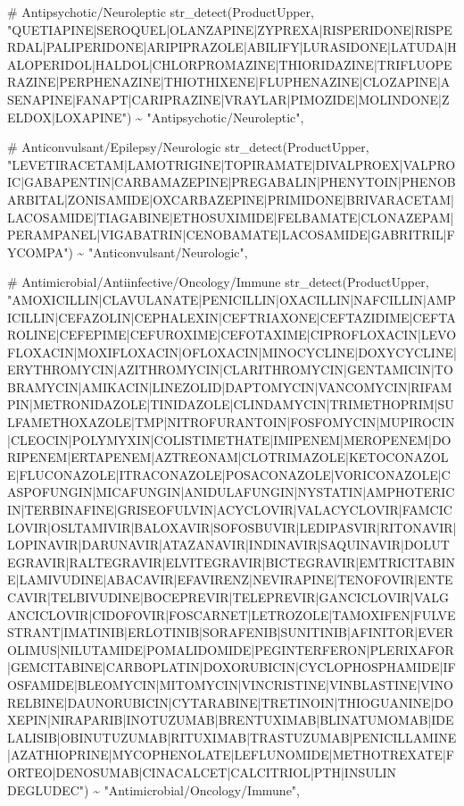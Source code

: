 \documentclass[
  letterpaper,
  DIV=11,
  numbers=noendperiod]{scrartcl}
\newenvironment{Shaded}{\begin{snugshade}}{\end{snugshade}}
\newcommand{\CommentTok}[1]{\textcolor[rgb]{0.37,0.37,0.37}{#1}}
\newcommand{\FunctionTok}[1]{\textcolor[rgb]{0.28,0.35,0.67}{#1}}
\newcommand{\NormalTok}[1]{\textcolor[rgb]{0.00,0.23,0.31}{#1}}
\newcommand{\SpecialCharTok}[1]{\textcolor[rgb]{0.37,0.37,0.37}{#1}}
\newcommand{\StringTok}[1]{\textcolor[rgb]{0.13,0.47,0.30}{#1}}
\begin{document}
\begin{Shaded}
\begin{Highlighting}[]
        \CommentTok{\# Antipsychotic/Neuroleptic}
        \FunctionTok{str\_detect}\NormalTok{(ProductUpper, }\StringTok{"QUETIAPINE|SEROQUEL|OLANZAPINE|ZYPREXA|RISPERIDONE|RISPERDAL|PALIPERIDONE|ARIPIPRAZOLE|ABILIFY|LURASIDONE|LATUDA|HALOPERIDOL|HALDOL|CHLORPROMAZINE|THIORIDAZINE|TRIFLUOPERAZINE|PERPHENAZINE|THIOTHIXENE|FLUPHENAZINE|CLOZAPINE|ASENAPINE|FANAPT|CARIPRAZINE|VRAYLAR|PIMOZIDE|MOLINDONE|ZELDOX|LOXAPINE"}\NormalTok{) }\SpecialCharTok{\textasciitilde{}} \StringTok{"Antipsychotic/Neuroleptic"}\NormalTok{,}
  
        \CommentTok{\# Anticonvulsant/Epilepsy/Neurologic}
        \FunctionTok{str\_detect}\NormalTok{(ProductUpper, }\StringTok{"LEVETIRACETAM|LAMOTRIGINE|TOPIRAMATE|DIVALPROEX|VALPROIC|GABAPENTIN|CARBAMAZEPINE|PREGABALIN|PHENYTOIN|PHENOBARBITAL|ZONISAMIDE|OXCARBAZEPINE|PRIMIDONE|BRIVARACETAM|LACOSAMIDE|TIAGABINE|ETHOSUXIMIDE|FELBAMATE|CLONAZEPAM|PERAMPANEL|VIGABATRIN|CENOBAMATE|LACOSAMIDE|GABRITRIL|FYCOMPA"}\NormalTok{) }\SpecialCharTok{\textasciitilde{}} \StringTok{"Anticonvulsant/Neurologic"}\NormalTok{,}
  
        \CommentTok{\# Antimicrobial/Antiinfective/Oncology/Immune}
        \FunctionTok{str\_detect}\NormalTok{(ProductUpper, }\StringTok{"AMOXICILLIN|CLAVULANATE|PENICILLIN|OXACILLIN|NAFCILLIN|AMPICILLIN|CEFAZOLIN|CEPHALEXIN|CEFTRIAXONE|CEFTAZIDIME|CEFTAROLINE|CEFEPIME|CEFUROXIME|CEFOTAXIME|CIPROFLOXACIN|LEVOFLOXACIN|MOXIFLOXACIN|OFLOXACIN|MINOCYCLINE|DOXYCYCLINE|ERYTHROMYCIN|AZITHROMYCIN|CLARITHROMYCIN|GENTAMICIN|TOBRAMYCIN|AMIKACIN|LINEZOLID|DAPTOMYCIN|VANCOMYCIN|RIFAMPIN|METRONIDAZOLE|TINIDAZOLE|CLINDAMYCIN|TRIMETHOPRIM|SULFAMETHOXAZOLE|TMP|NITROFURANTOIN|FOSFOMYCIN|MUPIROCIN|CLEOCIN|POLYMYXIN|COLISTIMETHATE|IMIPENEM|MEROPENEM|DORIPENEM|ERTAPENEM|AZTREONAM|CLOTRIMAZOLE|KETOCONAZOLE|FLUCONAZOLE|ITRACONAZOLE|POSACONAZOLE|VORICONAZOLE|CASPOFUNGIN|MICAFUNGIN|ANIDULAFUNGIN|NYSTATIN|AMPHOTERICIN|TERBINAFINE|GRISEOFULVIN|ACYCLOVIR|VALACYCLOVIR|FAMCICLOVIR|OSLTAMIVIR|BALOXAVIR|SOFOSBUVIR|LEDIPASVIR|RITONAVIR|LOPINAVIR|DARUNAVIR|ATAZANAVIR|INDINAVIR|SAQUINAVIR|DOLUTEGRAVIR|RALTEGRAVIR|ELVITEGRAVIR|BICTEGRAVIR|EMTRICITABINE|LAMIVUDINE|ABACAVIR|EFAVIRENZ|NEVIRAPINE|TENOFOVIR|ENTECAVIR|TELBIVUDINE|BOCEPREVIR|TELEPREVIR|GANCICLOVIR|VALGANCICLOVIR|CIDOFOVIR|FOSCARNET|LETROZOLE|TAMOXIFEN|FULVESTRANT|IMATINIB|ERLOTINIB|SORAFENIB|SUNITINIB|AFINITOR|EVEROLIMUS|NILUTAMIDE|POMALIDOMIDE|PEGINTERFERON|PLERIXAFOR|GEMCITABINE|CARBOPLATIN|DOXORUBICIN|CYCLOPHOSPHAMIDE|IFOSFAMIDE|BLEOMYCIN|MITOMYCIN|VINCRISTINE|VINBLASTINE|VINORELBINE|DAUNORUBICIN|CYTARABINE|TRETINOIN|THIOGUANINE|DOXEPIN|NIRAPARIB|INOTUZUMAB|BRENTUXIMAB|BLINATUMOMAB|IDELALISIB|OBINUTUZUMAB|RITUXIMAB|TRASTUZUMAB|PENICILLAMINE|AZATHIOPRINE|MYCOPHENOLATE|LEFLUNOMIDE|METHOTREXATE|FORTEO|DENOSUMAB|CINACALCET|CALCITRIOL|PTH|INSULIN DEGLUDEC"}\NormalTok{) }\SpecialCharTok{\textasciitilde{}} \StringTok{"Antimicrobial/Oncology/Immune"}\NormalTok{,}
  

\end{Highlighting}
\end{Shaded}
\end{document}
